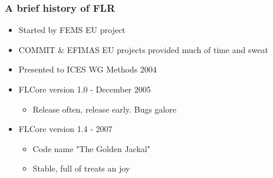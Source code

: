 \documentclass{beamer}%
\begin{document}
\begin{frame}
  \frametitle{A brief history of FLR}
  
  
  \begin{itemize}
	\item<1-> Started by FEMS EU project
	\item<2-> COMMIT \& EFIMAS EU projects provided much of time and sweat
	\item<3-> Presented to ICES WG Methods 2004
	\item<4-> FLCore version 1.0 - December 2005
	\begin{itemize}
		\item<4-> Release often, release early. Bugs galore
	\end{itemize}
  \end{itemize}
  \begin{itemize}
	\item<5-> FLCore version 1.4 - 2007
	\begin{itemize}
		\item<5-> Code name "The Golden Jackal"
		\item<5-> Stable, full of treats an joy
	\end{itemize}
   \end{itemize}
\end{frame}
\end{document}
